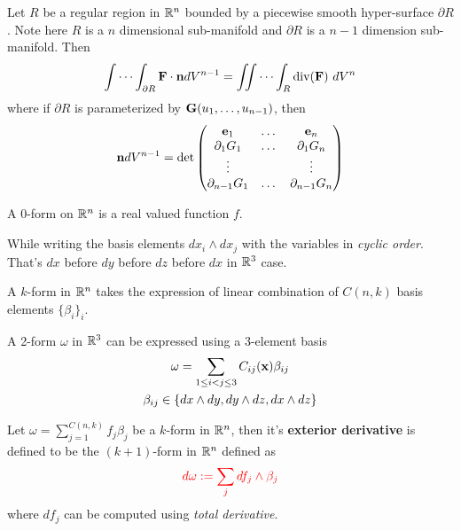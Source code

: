 \documentclass[11pt]{article}
\begin{document}
			\begin{theorem}
				Let $R$ be a regular region in $\mathbb{R}^n$ bounded by a piecewise smooth hyper-surface $\partial R$. Note here $R$ is a $n$ dimensional sub-manifold and $\partial R$ is a $n-1$ dimension sub-manifold. Then
				\begin{gather}
					\idotsint_{\partial R} \textbf{F} \cdot \textbf{n} dV^{n-1} = \iint \cdots \int_R \text{div}(\textbf{F})\ dV^n
				\end{gather}
				where if $\partial R$ is parameterized by $\textbf{G}(u_1, \dots, u_{n-1})$, then
				\begin{gather}
					\textbf{n}dV^{n-1} = \det \begin{pmatrix}
						\textbf{e}_1 & \dots & \textbf{e}_n \\
						\partial_1 G_1 & \dots & \partial_1 G_n \\
						\vdots & & \vdots \\
						\partial_{n-1} G_1 & \dots & \partial_{n-1} G_n
					\end{pmatrix}
				\end{gather}
			\end{theorem}
			
			\begin{definition}
				A 0-form on $\mathbb{R}^n$ is a real valued function $f$.
			\end{definition}
			
			\begin{remark}
				While writing the basis elements $dx_i \land dx_j$ with the variables in \emph{cyclic order}. That's $dx$ before $dy$ before $dz$ before $dx$ in $\mathbb{R}^3$ case.
			\end{remark}
			
			\begin{definition}
				A $k$-form in $\mathbb{R}^n$ takes the expression of linear combination of $C(n, k)$ basis elements $\{\beta_i\}_i$.
			\end{definition}
			
			\begin{example}
				A 2-form $\omega$ in $\mathbb{R}^3$ can be expressed using a 3-element basis 
				\begin{gather}
					\omega = \sum_{1 \leq i < j \leq 3} C_{ij}(\textbf{x}) \beta_{ij} \\
					\beta_{ij} \in \{dx \land dy, dy \land dz, dx \land dz\}
				\end{gather}
			\end{example}
			
			\begin{definition}
				Let $\omega = \sum_{j=1}^{C(n,k)} f_j \beta_j$ be a $k$-form in $\mathbb{R}^n$, then it's \textbf{exterior derivative} is defined to be the $(k+1)$-form in $\mathbb{R}^n$ defined as 
				\begin{gather}
					\textcolor{red}{d\omega := \sum_{j} df_j \land \beta_j}
				\end{gather}
				where $df_j$ can be computed using \emph{total derivative}.
			\end{definition}
			
\end{document}
